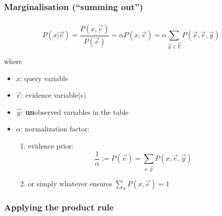 \subsubsection{Marginalisation (``summing out'')}



\begin{frame}\frametitle{\subsubsecname}

\begin{equation}
P(x | \vec e)
= \frac{P(x, \vec e)}{P(\vec e)}
= \alpha P(x, \vec e)
= \alpha \sum_{\vec y \in \vec Y} P(\vec x, \vec e, \vec y)
\end{equation}

where
\begin{itemize}
\item[] $x$: query variable
\item[] $\vec e$: evidence variable(s)
\item[] $\vec y$: \textbf{un}observed variables in the table
\item[] $\alpha$: normalization factor:


\pause

\begin{enumerate}
\item evidence prior:
\begin{equation}
\frac{1}{\alpha} := P(\vec e) = \sum_{x, \vec y} P(x, \vec e, \vec y)  
\end{equation}
\item or simply whatever ensures $\sum_{ x} P(x, \vec e) = 1$
\end{enumerate}

\end{itemize}
    
\end{frame}

\subsubsection{Applying the product rule}

